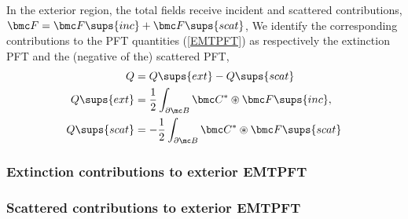In the exterior region, the total fields receive
incident and scattered contributions,
$\bmc F = \bmc F\sups{inc} + \bmc F\sups{scat}$,
We identify the corresponding contributions to the
PFT quantities (\ref{EMTPFT}) as respectively the
extinction PFT and the (negative of the) scattered PFT,
\begin{subequations}
\begin{align}
 Q &= Q\sups{ext} - Q\sups{scat}
\\
 Q\sups{ext}&=\frac{1}{2}\int_{\partial \mc B}\bmc C^* \circledast \bmc F\sups{inc},
\\
 Q\sups{scat}&=-\frac{1}{2}\int_{\partial \mc B}\bmc C^* \circledast \bmc F\sups{scat}
\end{align}
\label{ExtScat}%
\end{subequations}

\subsubsection*{Extinction contributions to exterior EMTPFT}

\subsubsection*{Scattered contributions to exterior EMTPFT}

